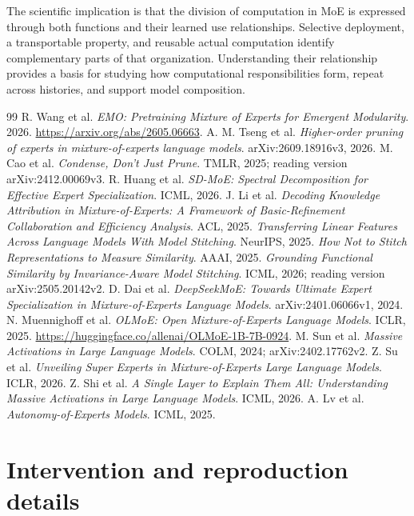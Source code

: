 \documentclass[10pt,twocolumn]{article}
\begin{document}
The scientific implication is that the division of computation in MoE is expressed through both functions and their learned use relationships.
Selective deployment, a transportable property, and reusable actual computation identify complementary parts of that organization.
Understanding their relationship provides a basis for studying how computational responsibilities form, repeat across histories, and support model composition.

\begin{thebibliography}{99}
 R. Wang et al. \emph{EMO: Pretraining Mixture of Experts for Emergent Modularity}. 2026. \url{https://arxiv.org/abs/2605.06663}.
 A. M. Tseng et al. \emph{Higher-order pruning of experts in mixture-of-experts language models}. arXiv:2609.18916v3, 2026.
 M. Cao et al. \emph{Condense, Don't Just Prune}. TMLR, 2025; reading version arXiv:2412.00069v3.
 R. Huang et al. \emph{SD-MoE: Spectral Decomposition for Effective Expert Specialization}. ICML, 2026.
 J. Li et al. \emph{Decoding Knowledge Attribution in Mixture-of-Experts: A Framework of Basic-Refinement Collaboration and Efficiency Analysis}. ACL, 2025.
 \emph{Transferring Linear Features Across Language Models With Model Stitching}. NeurIPS, 2025.
 \emph{How Not to Stitch Representations to Measure Similarity}. AAAI, 2025.
 \emph{Grounding Functional Similarity by Invariance-Aware Model Stitching}. ICML, 2026; reading version arXiv:2505.20142v2.
 D. Dai et al. \emph{DeepSeekMoE: Towards Ultimate Expert Specialization in Mixture-of-Experts Language Models}. arXiv:2401.06066v1, 2024.
 N. Muennighoff et al. \emph{OLMoE: Open Mixture-of-Experts Language Models}. ICLR, 2025. \url{https://huggingface.co/allenai/OLMoE-1B-7B-0924}.
 M. Sun et al. \emph{Massive Activations in Large Language Models}. COLM, 2024; arXiv:2402.17762v2.
 Z. Su et al. \emph{Unveiling Super Experts in Mixture-of-Experts Large Language Models}. ICLR, 2026.
 Z. Shi et al. \emph{A Single Layer to Explain Them All: Understanding Massive Activations in Large Language Models}. ICML, 2026.
 A. Lv et al. \emph{Autonomy-of-Experts Models}. ICML, 2025.
\end{thebibliography}

\appendix
\section{Intervention and reproduction details}
\end{document}
